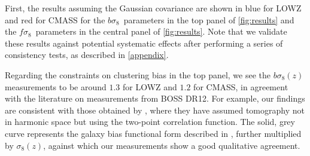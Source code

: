 \documentclass[astrosymb,twocolumn]{aastex631}
\newcommand{\bs}{\ensuremath{b\sigma_8}}
\renewcommand{\fs}{\ensuremath{f\!\sigma_8}}
\newcommand{\stefc}[1]{\textcolor{red}{\textsf{[\textbf{Stef:} #1]}}}
\begin{document}
First, the results assuming the Gaussian covariance are shown in blue for LOWZ and red for CMASS for the \bs\ parameters in the top panel of \autoref{fig:results} and the \fs\ parameters in the central panel of \autoref{fig:results}. Note that we validate these results against potential systematic effects after performing a series of consistency tests, as described in \autoref{appendix}.


Regarding the constraints on clustering bias in the top panel, we see the \(\bs(z)\) measurements to be around \(1.3\) for LOWZ and \(1.2\) for CMASS, in agreement with the literature on measurements from BOSS DR12. For example, our findings are consistent with those obtained by \citet[][see Figure\ 7]{Salazar2016}, where they have assumed tomography not in harmonic space but using the two-point correlation function. The solid, grey curve represents the galaxy bias functional form described in \citet{Salazar2016}, further multiplied by $\sigma_8(z)$, against which our measurements show a good qualitative agreement.
\end{document}
